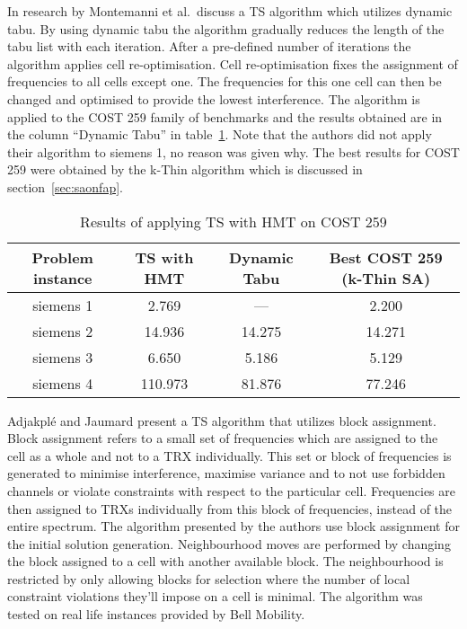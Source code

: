 In research by Montemanni et al.\ discuss a \gls{TS} algorithm which utilizes dynamic tabu\cite{MontiTS}. By using dynamic tabu the algorithm gradually reduces the length of the tabu list with each iteration. After a pre-defined number of iterations the algorithm applies cell re-optimisation. Cell re-optimisation fixes the assignment of frequencies to all cells except one. The frequencies for this one cell can then be changed and optimised to provide the lowest interference\cite{MontiTS}. The algorithm is applied to the COST 259 family of benchmarks and the results obtained are in the column ``Dynamic Tabu'' in table~\ref{TSCOST259}. Note that the authors did not apply their algorithm to siemens 1, no reason was given why. The best results for \gls{COST} 259 were obtained by the k-Thin algorithm which is discussed in section~\ref{sec:saonfap}.
\begin{table}[H]
\centering
	\begin{tabular}{| c | c | c | c |}
		\hline
        Problem instance & \gls{TS} with HMT & Dynamic Tabu & Best COST 259 (k-Thin SA) \\ \hline
        siemens 1 & 2.769 & --- & 2.200 \\ \hline
        siemens 2 & 14.936 & 14.275 & 14.271 \\ \hline
        siemens 3 & 6.650 & 5.186 & 5.129 \\ \hline
        siemens 4 & 110.973 & 81.876 & 77.246 \\ \hline
	\end{tabular}
\caption{Results of applying \gls{TS} with HMT on COST 259}
\label{TSCOST259}
\end{table}

Adjakpl\'{e} and Jaumard present a TS algorithm that utilizes block assignment\cite{AdJa97}. Block assignment refers to a small set of frequencies which are assigned to the cell as a whole and not to a TRX individually. This set or block of frequencies is generated to minimise interference, maximise variance and to not use forbidden channels or violate constraints with respect to the particular cell. Frequencies are then assigned to TRXs individually from this block of frequencies, instead of the entire spectrum. The algorithm presented by the authors use block assignment for the initial solution generation. Neighbourhood moves are performed by changing the block assigned to a cell with another available block. The neighbourhood is restricted by only allowing blocks for selection where the number of local constraint violations they'll impose on a cell is minimal. The algorithm was tested on real life instances provided by Bell Mobility.

